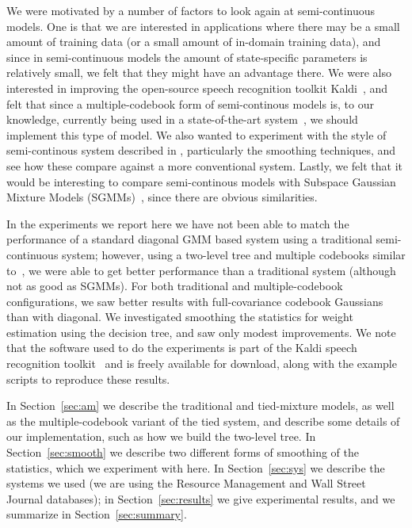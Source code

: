 \documentclass{article}
\begin{document}
We were motivated by a number of factors to look again at semi-continuous models.
One is that we are interested in applications where there may be a small amount
of training data (or a small amount of in-domain training data), and since
in semi-continuous models the amount of state-specific parameters is relatively
small, we felt that they might have an advantage there.  We were also interested
in improving the open-source speech recognition toolkit {\sc Kaldi}~\cite{povey2011tks},
and felt that since a multiple-codebook form of semi-continous models is, to
our knowledge, currently being used in a state-of-the-art system~\cite{prasad2004t2b},
we should implement this type of model.  We also wanted to experiment with
the style of semi-continous system described 
in \cite{schukattalamazzini1994srf,schukattalamazzini1995as}, particularly the smoothing
techniques, and see how these compare against a more conventional system.
Lastly, we felt that it would be interesting to compare semi-continous
models with Subspace Gaussian Mixture Models (SGMMs)~\cite{povey2011sgm}, since
there are obvious similarities.

In the experiments we report here we have not been able to match the performance of
a standard diagonal GMM based system using a traditional semi-continuous system;
however, using a two-level tree and multiple codebooks similar to~\cite{prasad2004t2b},
we were able to get better performance than a traditional system (although not
as good as SGMMs).  For both traditional and multiple-codebook configurations,
we saw better results with full-covariance codebook Gaussians than with diagonal.
We investigated smoothing the statistics for weight estimation using the decision
tree, and saw only modest improvements.
We note that the software used to do the experiments is part of the {\sc Kaldi} speech
recognition toolkit~\cite{povey2011tks} and is freely available for download, along with the
example scripts to reproduce these results.

In Section~\ref{sec:am} we describe the traditional and tied-mixture models,
as well as the multiple-codebook variant of the tied system, and describe some
details of our implementation, such as how we build the two-level tree.
In Section~\ref{sec:smooth} we describe two different forms of smoothing of the statistics,
which we experiment with here.  
In Section~\ref{sec:sys} we describe the systems we used (we are using
the Resource Management and Wall Street Journal databases);
in Section~\ref{sec:results} we give experimental results, and we
summarize in Section~\ref{sec:summary}.
\end{document}
